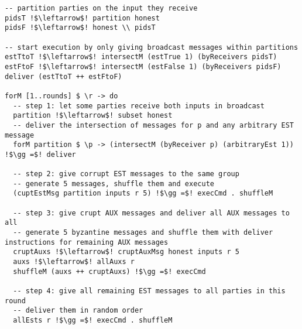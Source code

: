 \begin{lstlisting}
-- partition parties on the input they receive
pidsT !$\leftarrow$! partition honest
pidsF !$\leftarrow$! honest \\ pidsT

-- start execution by only giving broadcast messages within partitions
estTtoT !$\leftarrow$! intersectM (estTrue 1) (byReceivers pidsT)
estFtoF !$\leftarrow$! intersectM (estFalse 1) (byReceivers pidsF)
deliver (estTtoT ++ estFtoF)

forM [1..rounds] $ \r -> do
  -- step 1: let some parties receive both inputs in broadcast
  partition !$\leftarrow$! subset honest
  -- deliver the intersection of messages for p and any arbitrary EST message
  forM partition $ \p -> (intersectM (byReceiver p) (arbitraryEst 1)) !$\gg =$! deliver
       
  -- step 2: give corrupt EST messages to the same group
  -- generate 5 messages, shuffle them and execute
  (cuptEstMsg partition inputs r 5) !$\gg =$! execCmd . shuffleM

  -- step 3: give crupt AUX messages and deliver all AUX messages to all
  -- generate 5 byzantine messages and shuffle them with deliver instructions for remaining AUX messages
  cruptAuxs !$\leftarrow$! cruptAuxMsg honest inputs r 5
  auxs !$\leftarrow$! allAuxs r
  shuffleM (auxs ++ cruptAuxs) !$\gg =$! execCmd

  -- step 4: give all remaining EST messages to all parties in this round
  -- deliver them in random order
  allEsts r !$\gg =$! execCmd . shuffleM
\end{lstlisting}
